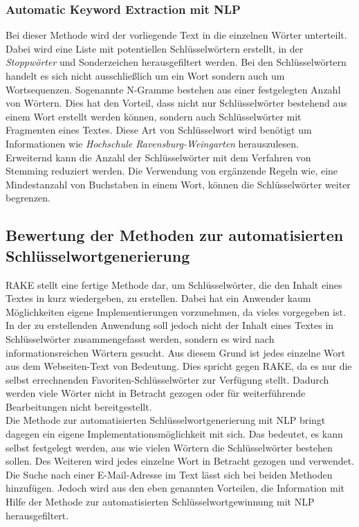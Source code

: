 		\subsubsection{Automatic Keyword Extraction mit NLP}
			\label{sec:Automatic Keyword Extraction}
			Bei dieser Methode wird der vorliegende Text in die einzelnen Wörter unterteilt. Dabei wird eine Liste mit potentiellen Schlüsselwörtern erstellt, in der \textit{Stoppwörter} und Sonderzeichen herausgefiltert werden. Bei den Schlüsselwörtern handelt es sich nicht ausschließlich um ein Wort sondern auch um Wortsequenzen. Sogenannte N-Gramme bestehen aus einer festgelegten Anzahl von Wörtern. Dies hat den Vorteil, dass nicht nur Schlüsselwörter bestehend aus einem Wort erstellt werden können, sondern auch Schlüsselwörter mit Fragmenten eines Textes. Diese Art von Schlüsselwort wird benötigt um Informationen wie \textit{Hochschule Ravensburg-Weingarten} herauszulesen.\\
			Erweiternd kann die Anzahl der Schlüsselwörter mit dem Verfahren von Stemming reduziert werden. Die Verwendung von ergänzende Regeln wie, eine Mindestanzahl von Buchstaben in einem Wort, können die Schlüsselwörter weiter begrenzen.
		
	\subsection{Bewertung der Methoden zur automatisierten Schlüsselwortgenerierung}
		RAKE stellt eine fertige Methode dar, um Schlüsselwörter, die den Inhalt eines Textes in kurz wiedergeben, zu erstellen. Dabei hat ein Anwender kaum Möglichkeiten eigene Implementierungen vorzunehmen, da vieles vorgegeben ist. In der zu erstellenden Anwendung soll jedoch nicht der Inhalt eines Textes in Schlüsselwörter zusammengefasst werden, sondern es wird nach informationsreichen Wörtern gesucht. Aus diesem Grund ist jedes einzelne Wort aus dem Webseiten-Text von Bedeutung. Dies spricht gegen RAKE, da es nur die selbst errechnenden Favoriten-Schlüsselwörter zur Verfügung stellt. Dadurch werden viele Wörter nicht in Betracht gezogen oder für weiterführende Bearbeitungen nicht bereitgestellt.\\
		Die Methode zur automatisierten Schlüsselwortgenerierung mit NLP bringt dagegen ein eigene Implementationsmöglichkeit mit sich. Das bedeutet, es kann selbst festgelegt werden, aus wie vielen Wörtern die Schlüsselwörter bestehen sollen. Des Weiteren wird jedes einzelne Wort in Betracht gezogen und verwendet.\\ Die Suche nach einer E-Mail-Adresse im Text lässt sich bei beiden Methoden hinzufügen. Jedoch wird aus den eben genannten Vorteilen, die Information mit Hilfe der Methode zur automatisierten Schlüsselwortgewinnung mit NLP herausgefiltert.
		
